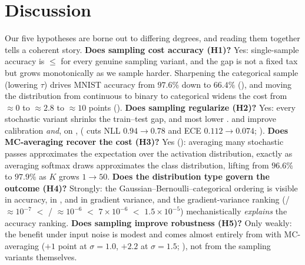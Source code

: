 \section{Discussion}\label{sec:discussion}

Our five hypotheses are borne out to differing degrees, and reading them together tells a
coherent story. {\bf Does sampling cost accuracy (H1)?} Yes: single-sample accuracy is
$\leq$ \detmode{} for every genuine sampling variant, and the gap is not a fixed tax but
grows monotonically as we sample harder. Sharpening the categorical sample (lowering $\tau$)
drives MNIST accuracy from $97.6\%$ down to $66.4\%$ (), and moving the
distribution from continuous to binary to categorical widens the cost from $\approx 0$ to
$\approx 2.8$ to $\approx 10$ points (). {\bf Does sampling regularize
(H2)?} Yes: every stochastic variant shrinks the train--test gap, and most lower \ece{}.
\gaussreparam{} and \bernoullist{} improve calibration \emph{and}, on \cifar{}, \nll{}
(\gaussreparam{} cuts NLL $0.94\to0.78$ and ECE $0.112\to0.074$; ). {\bf Does
MC-averaging recover the cost (H3)?} Yes (): averaging many stochastic passes
approximates the expectation over the activation distribution, exactly as averaging softmax
draws approximates the class distribution, lifting \dropout{} from $96.6\%$ to $97.9\%$ as
$K$ grows $1\to50$. {\bf Does the distribution type govern the outcome (H4)?} Strongly: the
Gaussian--Bernoulli--categorical ordering is visible in accuracy, in \nll{}, and in gradient
variance, and the gradient-variance ranking (\gaussnoise{}/\bernoullist{} $\approx10^{-7}$
$<$ \dropout{}/\gaussreparam{} $\approx10^{-6}$ $<$ \gumbelsoft{} $7\times10^{-6}$ $<$
\gumbelst{} $1.5\times10^{-5}$) mechanistically \emph{explains} the accuracy ranking. {\bf
Does sampling improve robustness (H5)?} Only weakly: the benefit under input noise is modest
and comes almost entirely from \dropout{} with MC-averaging ($+1$ point at $\sigma=1.0$,
$+2.2$ at $\sigma=1.5$; ), not from the sampling variants themselves.

